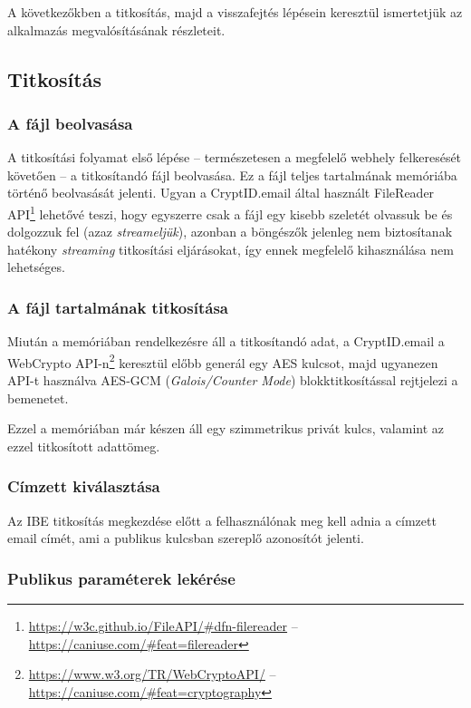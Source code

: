 A következőkben a titkosítás, majd a visszafejtés lépésein keresztül ismertetjük az alkalmazás megvalósításának részleteit.

\subsection{Titkosítás}

\subsubsection{A fájl beolvasása}

A titkosítási folyamat első lépése – természetesen a megfelelő webhely felkeresését követően – a titkosítandó fájl beolvasása. Ez a fájl teljes tartalmának memóriába történő beolvasását jelenti. Ugyan a CryptID.email által használt FileReader API\footnote{\url{https://w3c.github.io/FileAPI/#dfn-filereader} – \url{https://caniuse.com/#feat=filereader}} lehetővé teszi, hogy egyszerre csak a fájl egy kisebb szeletét olvassuk be és dolgozzuk fel (azaz \textit{streameljük}), azonban a böngészők jelenleg nem biztosítanak hatékony \textit{streaming} titkosítási eljárásokat, így ennek megfelelő kihasználása nem lehetséges.

\subsubsection{A fájl tartalmának titkosítása}

Miután a memóriában rendelkezésre áll a titkosítandó adat, a CryptID.email a WebCrypto API-n\footnote{\url{https://www.w3.org/TR/WebCryptoAPI/} – \url{https://caniuse.com/#feat=cryptography}} keresztül előbb generál egy AES kulcsot, majd ugyanezen API-t használva AES-GCM (\textit{Galois/Counter Mode}) blokktitkosítással rejtjelezi a bemenetet.

Ezzel a memóriában már készen áll egy szimmetrikus privát kulcs, valamint az ezzel titkosított adattömeg.

\subsubsection{Címzett kiválasztása}

Az IBE titkosítás megkezdése előtt a felhasználónak meg kell adnia a címzett email címét, ami a publikus kulcsban szereplő azonosítót jelenti.

\subsubsection{Publikus paraméterek lekérése}

